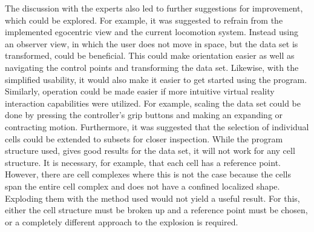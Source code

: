The discussion with the experts also led to further suggestions for improvement, which could be explored. For example, it was suggested to refrain from the implemented egocentric view and the current locomotion system. Instead using an observer view, in which the user does not move in space, but the data set is transformed, could be beneficial. This could make orientation easier as well as navigating the control points and transforming the data set. Likewise, with the simplified usability, it would also make it easier to get started using the program. Similarly, operation could be made easier if more intuitive virtual reality interaction capabilities were utilized. For example, scaling the data set could be done by pressing the controller's grip buttons and making an expanding or contracting motion. Furthermore, it was suggested that the selection of individual cells could be extended to subsets for closer inspection. While the program structure used, gives good results for the data set, it will not work for any cell structure. It is necessary, for example, that each cell has a reference point. However, there are cell complexes where this is not the case because the cells span the entire cell complex and does not have a confined localized shape. Exploding them with the method used would not yield a useful result. For this, either the cell structure must be broken up and a reference point must be chosen, or a completely different approach to the explosion is required.

